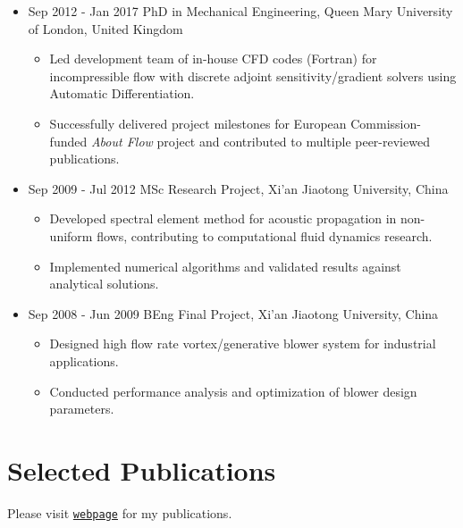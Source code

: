 \documentclass[letterpaper]{article}
\begin{document}
\begin{itemize}
\item Sep 2012 - Jan 2017  \hspace{2pt} PhD in Mechanical Engineering, Queen Mary University of London, United Kingdom
		\begin{itemize}
		\item Led development team of in-house CFD codes (Fortran) for incompressible flow with discrete adjoint sensitivity/gradient solvers using Automatic Differentiation.
		\item Successfully delivered project milestones for European Commission-funded \textsl{About Flow} project and contributed to multiple peer-reviewed publications.
		\end{itemize}
		
\item Sep 2009 - Jul 2012  \hspace{2pt} MSc Research Project, Xi'an Jiaotong University, China
  \begin{itemize}
  \item Developed spectral element method for acoustic propagation in non-uniform flows, contributing to computational fluid dynamics research.
  \item Implemented numerical algorithms and validated results against analytical solutions.
  \end{itemize}

\item Sep 2008 - Jun 2009  \hspace{2pt} BEng Final Project, Xi'an Jiaotong University, China
  \begin{itemize}
  \item Designed high flow rate vortex/generative blower system for industrial applications.
  \item Conducted performance analysis and optimization of blower design parameters.
  \end{itemize}
		
\end{itemize}

\section*{Selected Publications}
Please visit \href{https://raw.githubusercontent.com/guliyolanda/CV/master/YW-papers.pdf} {\tt webpage} for  my publications. 
\end{document}
